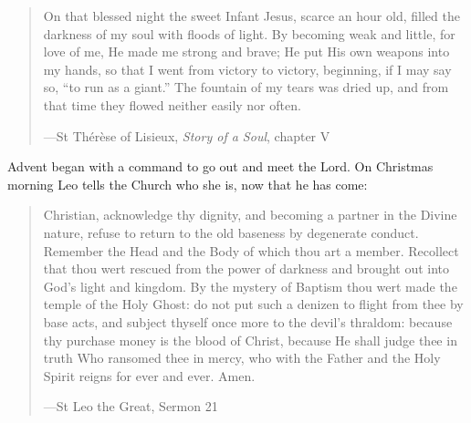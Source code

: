 \begin{quote}
On that blessed night the sweet Infant Jesus, scarce an hour old, filled the
darkness of my soul with floods of light. By becoming weak and little, for love
of me, He made me strong and brave; He put His own weapons into my hands, so
that I went from victory to victory, beginning, if I may say so, ``to run as a
giant.'' The fountain of my tears was dried up, and from that time they flowed
neither easily nor often.\par
{\smallskip\noindent\small ---St Thérèse of Lisieux, \emph{Story of a Soul}, chapter V\par}
\end{quote}

\noindent Advent began with a command to go out and meet the Lord. On Christmas
morning Leo tells the Church who she is, now that he has come:

\begin{quote}
Christian, acknowledge thy dignity, and becoming a partner in the Divine nature,
refuse to return to the old baseness by degenerate conduct. Remember the Head
and the Body of which thou art a member. Recollect that thou wert rescued from
the power of darkness and brought out into God's light and kingdom. By the
mystery of Baptism thou wert made the temple of the Holy Ghost: do not put such a
denizen to flight from thee by base acts, and subject thyself once more to the
devil's thraldom: because thy purchase money is the blood of Christ, because He
shall judge thee in truth Who ransomed thee in mercy, who with the Father and the
Holy Spirit reigns for ever and ever. Amen.\par
{\smallskip\noindent\small ---St Leo the Great, Sermon 21\par}
\end{quote}
